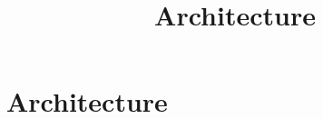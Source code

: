 \documentclass[../../OAE-SPEC-MAIN.tex]{subfiles}
\title{Architecture}
\begin{document}
\chapter{Architecture}\label{sec:architecture}



\clearpage

\clearpage

\clearpage

\clearpage

\end{document}
